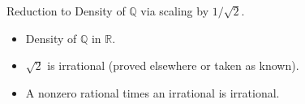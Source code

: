 \begin{remark*}
Reduction to Density of $\mathbb{Q}$ via scaling by $1/\sqrt{2}$.
\end{remark*}

\begin{remark*}[Dependencies]
\begin{itemize}
  \item Density of $\mathbb{Q}$ in $\mathbb{R}$.
  \item $\sqrt{2}$ is irrational (proved elsewhere or taken as known).
  \item A nonzero rational times an irrational is irrational.
\end{itemize}
\end{remark*}
